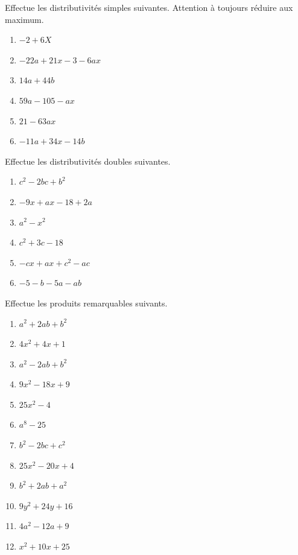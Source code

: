 \documentclass[12pt,parskip=half-, twoside=semi]{scrartcl}
\begin{document}
\begin{exercise}Effectue les distributivités simples suivantes. Attention à toujours réduire aux maximum.
  \begin{enumerate}[cols=2]
    \item $-2+6X$
    \item $-22a+21x-3-6ax$
    \item $14a+44b$
    \item $59a-105-ax$
    \item $21-63ax$
    \item $-11a+34x-14b$
  \end{enumerate}
\end{exercise}


\begin{exercise}Effectue les distributivités doubles suivantes.
  \begin{enumerate}[cols=3]
    \item $c^2-2bc+b^2$
    \item $-9x+ax-18+2a$
    \item $a^2-x^2$
    \item $c^2+3c-18$
    \item $-cx+ax+c^2-ac$
    \item $-5-b-5a-ab$
  \end{enumerate}
\end{exercise}

\begin{exercise}Effectue les produits remarquables suivants.
  \begin{enumerate}[cols=3]
      \item $a^2+2ab+b^2$
      \item $4x^2+4x+1$
      \item $a^2-2ab+b^2$
      \item $9x^2-18x+9$
      \item $25x^2-4$
      \item $a^8-25$
      \item $b^2-2bc+c^2$
      \item $25x^2-20x+4$
      \item $b^2+2ab+a^2$
      \item $9y^2+24y+16$
      \item $4a^2-12a+9$
      \item $x^2+10x+25$
  \end{enumerate}
\end{exercise}
\end{document}
